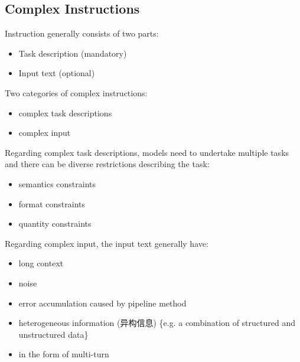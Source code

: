 \documentclass{beamer}
\begin{document}
\subsection{Complex Instructions}

\begin{frame}
    Instruction generally consists of two parts:
    \begin{itemize}
        \item {Task description (mandatory)}
        \item {Input text (optional)}
    \end{itemize}

    Two categories of complex instructions:
    \begin{itemize}
        \item {complex task descriptions}
        \item {complex input}
    \end{itemize}

\end{frame}

\begin{frame}

    Regarding complex task descriptions, models need to undertake multiple tasks and there can be diverse restrictions describing the task:
    \begin{itemize}
        \item {semantics constraints}
        \item {format constraints}
        \item {quantity constraints}
    \end{itemize}
    Regarding complex input, the input text generally have:
    \begin{itemize}
        \item {long context}
        \item {noise}
        \item {error accumulation caused by pipeline method}
        \item {heterogeneous information (异构信息) \{e.g. a combination of structured and unstructured data\}}
        \item {in the form of multi-turn}
    \end{itemize}
\end{frame}
\end{document}
